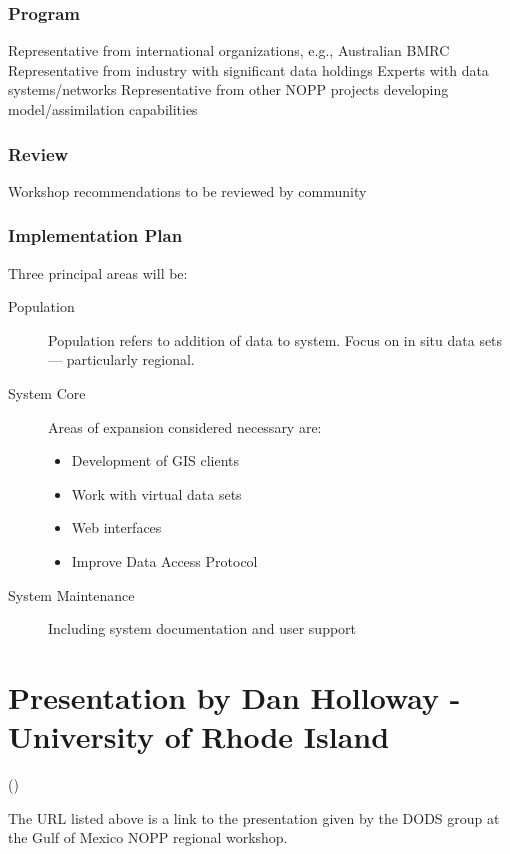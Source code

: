 \subsubsection{Program}
        Representative from international organizations, e.g., Australian BMRC
        Representative from industry with significant data holdings
        Experts with data systems/networks
        Representative from other NOPP projects developing model/assimilation capabilities

\subsubsection{Review}
        Workshop recommendations to be reviewed by community


\subsubsection{Implementation Plan}

Three principal areas will be:

\begin{description}
\item[Population]
Population refers to addition of data to system. Focus on in situ data sets --- particularly regional.

\item[System Core]

Areas of expansion considered necessary are:
\begin{itemize}
\item      Development of GIS clients
\item     Work with virtual data sets
\item     Web interfaces
\item     Improve Data Access Protocol
\end{itemize}

\item[System Maintenance]
Including system documentation and user support
\end{description}

\section{Presentation by Dan Holloway - University of Rhode Island}
\label{I,DODS}

()

The URL listed above is a link to the presentation given by the DODS group at the Gulf of 
Mexico NOPP regional workshop.

